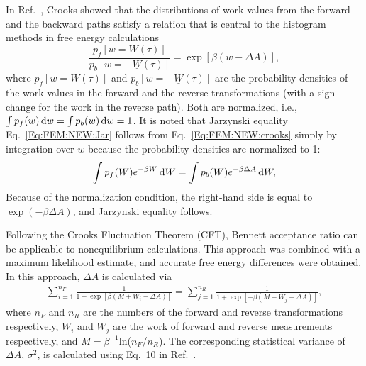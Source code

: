 In Ref.~\cite{CrooksJSP1998}, Crooks showed that the distributions of work values from the forward and the backward paths satisfy a relation that is central to the histogram methods in free energy calculations
\begin{equation}
\frac{p_{f}[w=W(\tau)]}{p_{b}[w=-\underline{W}(\tau)]}=\exp[\beta(w-\Delta A)],
\label{Eq:FEM:NEW:crooks}
\end{equation}
where $p_{f}[w=W(\tau)]$ and $p_{b}[w=-\underline{W}(\tau)]$ are the probability densities of the work values in the forward and the reverse transformations (with a sign change for the work in the reverse path). Both are normalized, i.e., $\int p_{f}(w) \mathop{}\!\mathrm{d} w=\int p_{b}(w) \mathop{}\!\mathrm{d} w=1$. It is noted that Jarzynski equality Eq.~\ref{Eq:FEM:NEW:Jar} follows from Eq.~\ref{Eq:FEM:NEW:crooks} simply by integration over $w$ because the probability densities are normalized to 1:
\begin{equation}
\int p_{f}(W)e^{-\beta W}\mathop{}\!\mathrm{d} W=\int p_{b}(W)e^{-\beta \Delta A}\mathop{}\!\mathrm{d} W,
\label{Eq:FEM:NEW:crookstojar}
\end{equation}
Because of the normalization condition, the right-hand side is equal to $\exp(-\beta \Delta A)$, and Jarzynski equality follows.

Following the Crooks Fluctuation Theorem (CFT),\cite{CrooksJSP1998} Bennett acceptance ratio can be applicable to nonequilibrium calculations. This approach was combined with a maximum likelihood estimate, and accurate free energy differences were obtained.\cite{ShirtsPRL2003}
In this approach, $\Delta A$ is calculated via
\begin{align}
\sum_{i=1}^{n_{F}}\frac{1}{1+\exp \left[\beta(M+W_{i}-\Delta A)\right]} = \sum_{j=1}^{n_{R}}\frac{1}{1+\exp \left[-\beta(M+W_{j}-\Delta A)\right]},
\label{Eq:FEM:NEW:NEBAR}
\end{align}
where $n_{F}$ and $n_{R}$ are the numbers of the forward and reverse transformations respectively, $W_{i}$ and $W_{j}$ are the work of forward and reverse measurements respectively, and $M=\beta^{-1}$ln($n_{F}$/$n_{R}$).
The corresponding statistical variance of $ \Delta A $, $ \sigma^2 $, is calculated using Eq.~10 in Ref.~\cite{ShirtsPRL2003}.